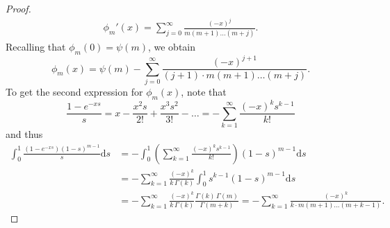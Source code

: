 \documentclass[12pt]{article}
\newcommand{\1}{\mathbf{1}}
\begin{document}
\begin{proof}
\begin{align}\label{phiT}
\phi_m'(x)=
\sum_{j=0}^\infty \frac{(-x)^j}{m(m+1)\dots(m+j)}.
\end{align}
Recalling that $\phi_m(0)=\psi(m)$, we obtain $$\phi_m(x)=\psi(m)-\sum_{j=0}^\infty \frac{(-x)^{j+1}}{(j+1)\cdot m(m+1)\dots(m+j)}.$$
To get the second expression for $\phi_m(x)$, note that
$$
\frac{1-e^{-xs}}{s}=x-\frac{x^2s}{2!}+\frac{x^3s^2}{3!}-\dots=-\sum_{k=1}^\infty \frac{(-x)^ks^{k-1}}{k!}
$$
and thus
\begin{align*}
\int_0^1 \frac{(1-e^{-xs})(1-s)^{m-1}}{s}\mathrm{d}s
&=-\int_0^1 \left(\sum_{k=1}^\infty \frac{(-x)^ks^{k-1}}{k!}\right)(1-s)^{m-1}\mathrm{d}s
\\ &
=-\sum_{k=1}^\infty \frac{(-x)^k}{k\,\Gamma(k)}\int_0^1 s^{k-1}(1-s)^{m-1}\mathrm{d}s
\\ &=-
\sum_{k=1}^\infty \frac{(-x)^k}{k\,\Gamma(k)} \frac{\Gamma(k)\,\Gamma(m)}{\Gamma(m+k)}
=-
\sum_{k=1}^\infty \frac{(-x)^k}{k\cdot m(m+1)\dots(m+k-1)}.
\end{align*}
\end{proof}
\end{document}
